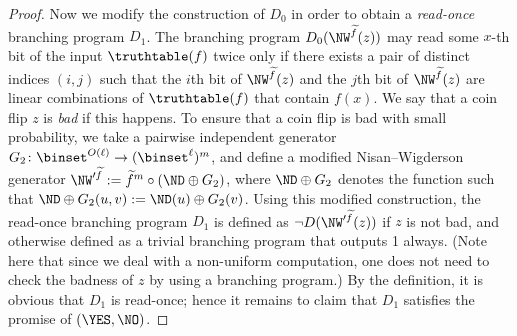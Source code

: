 \documentclass[11pt]{article}
\numberwithin{equation}{section}
\theoremstyle{definition}
\theoremstyle{plain}
\begin{document}
\begin{proof}
  Now we modify the construction of $D_0$ in order to obtain a \emph{read-once} branching program $D_1$.
  The branching program $D_0(\NW^{\widetilde{f}}(z))$ may read some $x$-th bit of the input $\truthtable(f)$ twice only if
  there exists a pair of distinct indices $(i, j)$ such that the $i$th bit of $\NW^{\widetilde{f}}(z)$ and the $j$th bit of $\NW^{\widetilde{f}}(z)$
  are linear combinations of $\truthtable(f)$ that contain $f(x)$.
  We say that a coin flip $z$ is \emph{bad} if this happens.
  To ensure that a coin flip is bad with small probability,
  we take a pairwise independent generator $G_2 \colon \binset^{O(\ell)} \to (\binset^{\ell})^{m}$,
  and define a modified Nisan--Wigderson generator $\NW'^{\widetilde{f}} := {\widetilde{f}}^m \circ (\ND \oplus G_2)$,
  where $\ND \oplus G_2$ denotes the function such that $\ND \oplus G_2(u, v) := \ND(u) \oplus G_2(v)$.
  Using this modified construction,
  the read-once branching program $D_1$ is defined as $\neg D(\NW'^{\widetilde{f}}(z))$ if $z$ is not bad, and otherwise defined as a trivial branching program that outputs 1 always.
  (Note here that since we deal with a non-uniform computation, one does not need to check the badness of $z$ by using a branching program.)
  By the definition, it is obvious that $D_1$ is read-once; hence it remains to claim that $D_1$ satisfies the promise of $(\YES, \NO)$.


\end{proof}
\end{document}
